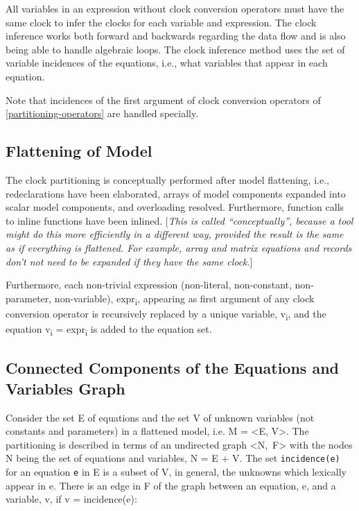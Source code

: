 All variables in an expression without clock conversion operators must
have the same clock to infer the clocks for each variable and
expression. The clock inference works both forward and backwards
regarding the data flow and is also being able to handle algebraic
loops. The clock inference method uses the set of variable incidences of
the equations, i.e., what variables that appear in each equation.

Note that incidences of the first argument of clock conversion operators
of \autoref{partitioning-operators} are handled specially.

\subsection{Flattening of Model}

The clock partitioning is conceptually performed after model flattening,
i.e., redeclarations have been elaborated, arrays of model components
expanded into scalar model components, and overloading resolved.
Furthermore, function calls to inline functions have been inlined.
{[}\emph{This is called ``conceptually'', because a tool might do this
more efficiently in a different way, provided the result is the same as
if everything is flattened. For example, array and matrix equations and
records don't not need to be expanded if they have the same clock.}{]}

Furthermore, each non-trivial expression (non-literal, non-constant,
non-parameter, non-variable), expr\textsubscript{i}, appearing as first
argument of any clock conversion operator is recursively replaced by a
unique variable, v\textsubscript{i}, and the equation v\textsubscript{i}
= expr\textsubscript{i} is added to the equation set.

\subsection{Connected Components of the Equations and Variables Graph}

Consider the set E of equations and the set V of unknown variables (not
constants and parameters) in a flattened model, i.e. M = \textless{}E,
V\textgreater{}. The partitioning is described in terms of an undirected
graph \textless{}N,~F\textgreater{} with the nodes N being the set of
equations and variables, N = E + V. The set \lstinline!incidence(e)! for an equation
\lstinline!e! in E is a subset of V, in general, the unknowns which lexically appear
in e. There is an edge in F of the graph between an equation, e, and a
variable, v, if v = incidence(e):

